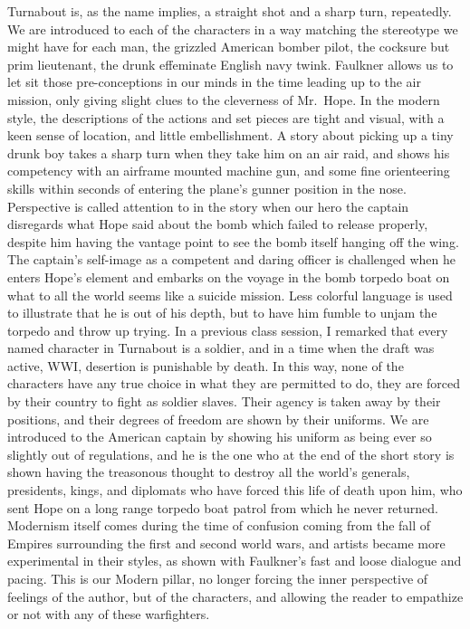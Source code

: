 \documentclass[
]{article}
\begin{document}
Turnabout is, as the name implies, a straight shot and a sharp turn,
repeatedly. We are introduced to each of the characters in a way
matching the stereotype we might have for each man, the grizzled
American bomber pilot, the cocksure but prim lieutenant, the drunk
effeminate English navy twink. Faulkner allows us to let sit those
pre-conceptions in our minds in the time leading up to the air mission,
only giving slight clues to the cleverness of Mr.~Hope. In the modern
style, the descriptions of the actions and set pieces are tight and
visual, with a keen sense of location, and little embellishment. A story
about picking up a tiny drunk boy takes a sharp turn when they take him
on an air raid, and shows his competency with an airframe mounted
machine gun, and some fine orienteering skills within seconds of
entering the plane's gunner position in the nose. Perspective is called
attention to in the story when our hero the captain disregards what Hope
said about the bomb which failed to release properly, despite him having
the vantage point to see the bomb itself hanging off the wing. The
captain's self-image as a competent and daring officer is challenged
when he enters Hope's element and embarks on the voyage in the bomb
torpedo boat on what to all the world seems like a suicide mission. Less
colorful language is used to illustrate that he is out of his depth, but
to have him fumble to unjam the torpedo and throw up trying. In a
previous class session, I remarked that every named character in
Turnabout is a soldier, and in a time when the draft was active, WWI,
desertion is punishable by death. In this way, none of the characters
have any true choice in what they are permitted to do, they are forced
by their country to fight as soldier slaves. Their agency is taken away
by their positions, and their degrees of freedom are shown by their
uniforms. We are introduced to the American captain by showing his
uniform as being ever so slightly out of regulations, and he is the one
who at the end of the short story is shown having the treasonous thought
to destroy all the world's generals, presidents, kings, and diplomats
who have forced this life of death upon him, who sent Hope on a long
range torpedo boat patrol from which he never returned. Modernism itself
comes during the time of confusion coming from the fall of Empires
surrounding the first and second world wars, and artists became more
experimental in their styles, as shown with Faulkner's fast and loose
dialogue and pacing. This is our Modern pillar, no longer forcing the
inner perspective of feelings of the author, but of the characters, and
allowing the reader to empathize or not with any of these warfighters.
\end{document}
